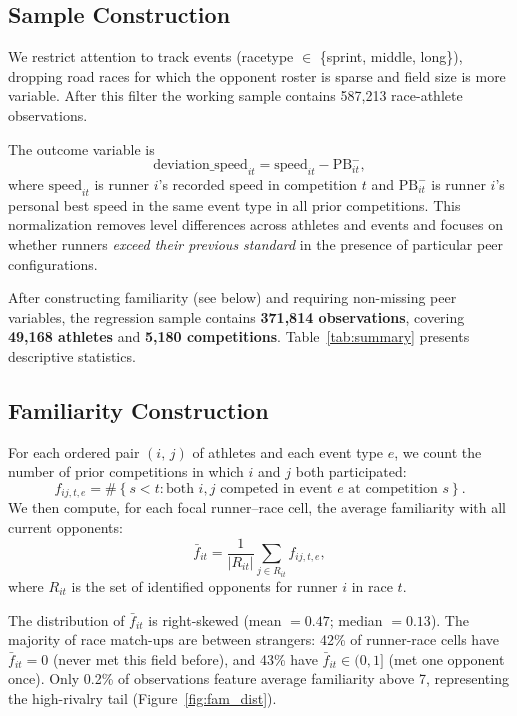 \documentclass[12pt]{article}
\theoremstyle{definition}
\theoremstyle{remark}
\begin{document}
\subsection{Sample Construction}

We restrict attention to track events (racetype $\in$ \{sprint, middle, long\}),
dropping road races for which the opponent roster is sparse and field size is more
variable.
After this filter the working sample contains 587{,}213 race-athlete observations.

The outcome variable is
\begin{equation}
\text{deviation\_speed}_{it} = \text{speed}_{it} - \text{PB}_{it}^-,
\label{eq:outcome}
\end{equation}
where $\text{speed}_{it}$ is runner $i$'s recorded speed in competition $t$ and
$\text{PB}_{it}^-$ is runner $i$'s personal best speed in the same event type
in all prior competitions.
This normalization removes level differences across athletes and events and focuses
on whether runners \emph{exceed their previous standard} in the presence of particular
peer configurations.

After constructing familiarity (see below) and requiring non-missing peer variables,
the regression sample contains \textbf{371{,}814 observations}, covering
\textbf{49{,}168 athletes} and \textbf{5{,}180 competitions}.
Table~\ref{tab:summary} presents descriptive statistics.

\subsection{Familiarity Construction}

For each ordered pair $(i,\,j)$ of athletes and each event type $e$, we count
the number of prior competitions in which $i$ and $j$ both participated:
\begin{equation}
f_{ij,t,e} = \#\!\left\{s < t : \text{both } i,j \text{ competed in event } e
\text{ at competition } s\right\}.
\label{eq:familiarity}
\end{equation}
We then compute, for each focal runner--race cell, the average familiarity with
all current opponents:
\begin{equation}
\bar{f}_{it} = \frac{1}{|R_{it}|}\sum_{j \in R_{it}} f_{ij,t,e},
\label{eq:avg_fam}
\end{equation}
where $R_{it}$ is the set of identified opponents for runner $i$ in race $t$.

The distribution of $\bar{f}_{it}$ is right-skewed (mean $= 0.47$; median $= 0.13$).
The majority of race match-ups are between strangers: 42\% of runner-race cells have
$\bar{f}_{it} = 0$ (never met this field before), and 43\% have $\bar{f}_{it} \in (0,1]$
(met one opponent once).
Only 0.2\% of observations feature average familiarity above 7, representing
the high-rivalry tail (Figure~\ref{fig:fam_dist}).
\end{document}
